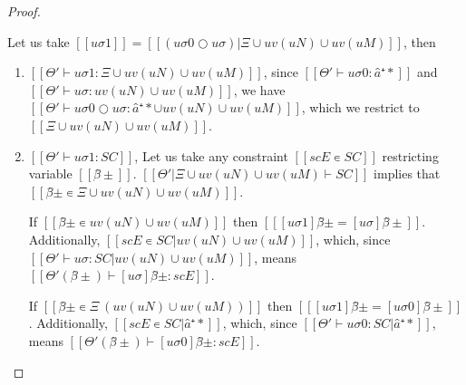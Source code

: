 \begin{proof}
\begin{caseof}
\begin{enumerate}
\begin{itemize}
                            Let us take $[[uσ1]] = [[(uσ0 ○ uσ)|Ξ ∪ uv(uN) ∪ uv(uM)]]$, then 
                            \begin{enumerate}
                                \item $[[Θ' ⊢ uσ1 : Ξ ∪ uv(uN) ∪ uv(uM)]]$,
                                    since $[[Θ' ⊢ uσ0 : â⁺*]]$ and 
                                    $[[ Θ' ⊢ uσ : uv(uN) ∪ uv(uM) ]]$, 
                                    we have 
                                    $[[Θ' ⊢ uσ0 ○ uσ : â⁺* ∪ uv(uN) ∪ uv(uM)]]$, 
                                    which we restrict to $[[Ξ ∪ uv(uN) ∪ uv(uM)]]$.
                                \item $[[Θ' ⊢ uσ1 : SC]]$,
                                    Let us take any constraint $[[scE ∊ SC]]$ restricting 
                                    variable $[[β̂±]]$.
                                    $[[Θ'|Ξ ∪ uv(uN) ∪ uv(uM) ⊢ SC]]$
                                    implies that $[[β̂± ∊ Ξ ∪ uv(uN) ∪ uv(uM)]]$.

                                    If $[[β̂± ∊ uv(uN) ∪ uv(uM)]]$ then 
                                    $[[ [uσ1]β̂± = [uσ]β̂± ]]$.
                                    Additionally, $[[scE ∊ SC | uv(uN) ∪ uv(uM)]]$,
                                    which, since $[[ Θ' ⊢ uσ : SC | uv(uN) ∪ uv(uM) ]]$,
                                    means $[[Θ'(β̂±) ⊢ [uσ]β̂± : scE]]$.

                                    If $[[β̂± ∊ Ξ \ (uv(uN) ∪ uv(uM))]]$ then
                                    $[[ [uσ1]β̂± = [uσ0]β̂± ]]$.
                                    Additionally, $[[scE ∊ SC | {â⁺*}]]$,
                                    which, since $[[ Θ' ⊢ uσ0 : SC | {â⁺*} ]]$,
                                    means $[[Θ'(β̂±) ⊢ [uσ0]β̂± : scE]]$.


\end{enumerate}
\end{itemize}
\end{enumerate}
\end{caseof}
\end{proof}
